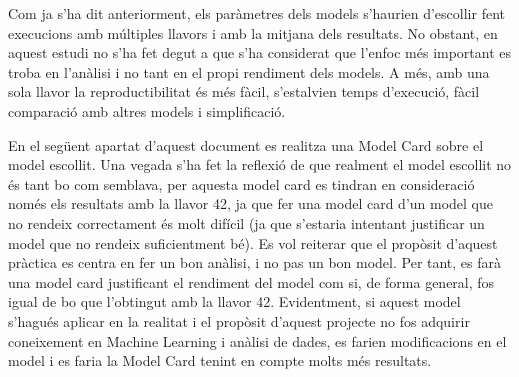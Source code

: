 Com ja s'ha dit anteriorment, els paràmetres dels models s'haurien d'escollir fent execucions amb múltiples llavors i amb la mitjana dels resultats. No obstant, en aquest estudi no s'ha fet degut a que s'ha considerat que l'enfoc més important es troba en l'anàlisi i no tant en el propi rendiment dels models. A més, amb una sola llavor la reproductibilitat és més fàcil, s'estalvien temps d'execució, fàcil comparació amb altres models i simplificació.

En el següent apartat d'aquest document es realitza una Model Card sobre el model escollit. Una vegada s'ha fet la reflexió de que realment el model escollit no és tant bo com semblava, per aquesta model card es tindran en consideració només els resultats amb la llavor 42, ja que fer una model card d'un model que no rendeix correctament és molt difícil (ja que s'estaria intentant justificar un model que no rendeix suficientment bé). Es vol reiterar que el propòsit d'aquest pràctica es centra en fer un bon anàlisi, i no pas un bon model. Per tant, es farà una model card justificant el rendiment del model com si, de forma general, fos igual de bo que l'obtingut amb la llavor 42. Evidentment, si aquest model s'hagués aplicar en la realitat i el propòsit d'aquest projecte no fos adquirir coneixement en Machine Learning i anàlisi de dades, es farien modificacions en el model i es faria la Model Card tenint en compte molts més resultats.
